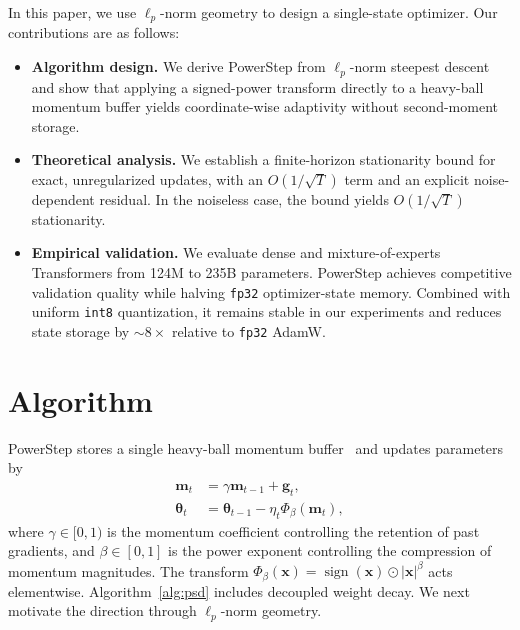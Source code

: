 \documentclass{article}
\begin{document}
In this paper, we use $\ell_p$-norm geometry to design a single-state optimizer. Our contributions are as follows:

\begin{itemize}
    \item \textbf{Algorithm design.} We derive PowerStep from $\ell_p$-norm steepest descent and show that applying a signed-power transform directly to a heavy-ball momentum buffer yields coordinate-wise adaptivity without second-moment storage.
    \item \textbf{Theoretical analysis.} We establish a finite-horizon stationarity bound for exact, unregularized updates, with an $O(1/\sqrt{T})$ term and an explicit noise-dependent residual. In the noiseless case, the bound yields $O(1/\sqrt{T})$ stationarity.
    \item \textbf{Empirical validation.} We evaluate dense and mixture-of-experts Transformers from 124M to 235B parameters. PowerStep achieves competitive validation quality while halving \texttt{fp32} optimizer-state memory. Combined with uniform \texttt{int8} quantization, it remains stable in our experiments and reduces state storage by $\sim8\times$ relative to \texttt{fp32} AdamW.
\end{itemize}

\section{Algorithm}
\label{sec:algorithm}

PowerStep stores a single heavy-ball momentum buffer~\citep{polyak1964some} and updates parameters by
\begin{align}
\mathbf{m}_t &= \gamma \mathbf{m}_{t-1} + \mathbf{g}_t, \label{eq:powerstep1} \\
\bm{\theta}_t &= \bm{\theta}_{t-1} - \eta_t \Phi_\beta(\mathbf{m}_t), \label{eq:powerstep2}
\end{align}
where $\gamma\in[0,1)$ is the momentum coefficient controlling the retention of past gradients, and $\beta\in[0,1]$ is the power exponent controlling the compression of momentum magnitudes. The transform $\Phi_\beta(\mathbf x)=\operatorname{sign}(\mathbf x)\odot|\mathbf x|^\beta$ acts elementwise. Algorithm~\ref{alg:psd} includes decoupled weight decay. We next motivate the direction through $\ell_p$-norm geometry.
\end{document}
